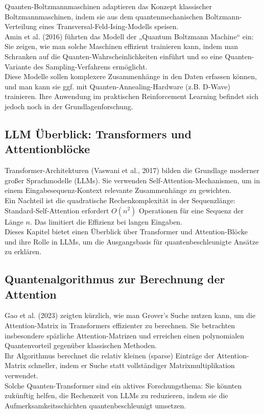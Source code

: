 Quanten-Boltzmannmaschinen adaptieren das Konzept klassischer Boltzmannmaschinen, indem sie aus dem quantenmechanischen Boltzmann-Verteilung eines Transversal-Feld-Ising-Modells speisen.\\
Amin et al. (2016) führten das Modell der „Quantum Boltzmann Machine“ ein: Sie zeigen, wie man solche Maschinen effizient trainieren kann, indem man Schranken auf die Quanten-Wahrscheinlichkeiten einführt und so eine Quanten-Variante des Sampling-Verfahrens ermöglicht.\\
Diese Modelle sollen komplexere Zusammenhänge in den Daten erfassen können, und man kann sie ggf. mit Quanten-Annealing-Hardware (z.B. D-Wave) trainieren. Ihre Anwendung im praktischen Reinforcement Learning befindet sich jedoch noch in der Grundlagenforschung.

\subsection{LLM Überblick: Transformers und Attentionblöcke}

Transformer-Architekturen (Vaswani et al., 2017) bilden die Grundlage moderner großer Sprachmodelle (LLMs). Sie verwenden Self-Attention-Mechanismen, um in einem Eingabesequenz-Kontext relevante Zusammenhänge zu gewichten.\\
Ein Nachteil ist die quadratische Rechenkomplexität in der Sequenzlänge: Standard-Self-Attention erfordert $O(n^2)$ Operationen für eine Sequenz der Länge $n$. Das limitiert die Effizienz bei langen Eingaben.\\
Dieses Kapitel bietet einen Überblick über Transformer und Attention-Blöcke und ihre Rolle in LLMs, um die Ausgangsbasis für quantenbeschleunigte Ansätze zu erklären.

\subsection{Quantenalgorithmus zur Berechnung der Attention}

Gao et al. (2023) zeigten kürzlich, wie man Grover’s Suche nutzen kann, um die Attention-Matrix in Transformers effizienter zu berechnen. Sie betrachten insbesondere spärliche Attention-Matrizen und erreichen einen polynomialen Quantenvorteil gegenüber klassischen Methoden.\\
Ihr Algorithmus berechnet die relativ kleinen (sparse) Einträge der Attention-Matrix schneller, indem er Suche statt vollständiger Matrixmultiplikation verwendet.\\
Solche Quanten-Transformer sind ein aktives Forschungsthema: Sie könnten zukünftig helfen, die Rechenzeit von LLMs zu reduzieren, indem sie die Aufmerksamkeitsschichten quantenbeschleunigt umsetzen.

\printbibliography
